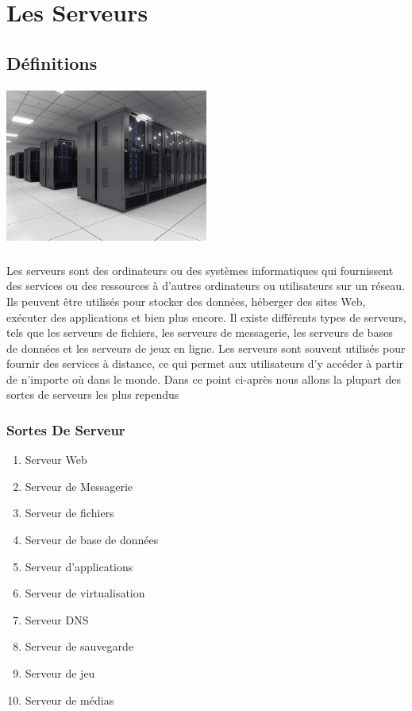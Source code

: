  
 
  \chapter{ Les Serveurs}
 \section{Définitions}
\paragraph{ \includegraphics[width=0.5\textwidth]{salle-serveur.jpg}}
\paragraph{ }
Les serveurs sont des ordinateurs ou des systèmes informatiques qui fournissent des services ou des ressources à d'autres ordinateurs ou utilisateurs sur un réseau. Ils peuvent être utilisés pour stocker des données, héberger des sites Web, exécuter des applications et bien plus encore. Il existe différents types de serveurs, tels que les serveurs de fichiers, les serveurs de messagerie, les serveurs de bases de données et les serveurs de jeux en ligne. Les serveurs sont souvent utilisés pour fournir des services à distance, ce qui permet aux utilisateurs d'y accéder à partir de n'importe où dans le monde.
 Dans ce point ci-après nous allons la plupart des sortes de serveurs les plus rependus 
 \subsection*{ Sortes De Serveur}
\begin{enumerate}
     \item Serveur Web
     \item Serveur de Messagerie
     \item Serveur de fichiers
     \item Serveur de base de données 
     \item Serveur d'applications
     \item Serveur de virtualisation
     \item Serveur DNS
     \item Serveur de sauvegarde 
     \item Serveur de jeu 
     \item Serveur de médias 
     
\end{enumerate}
 
